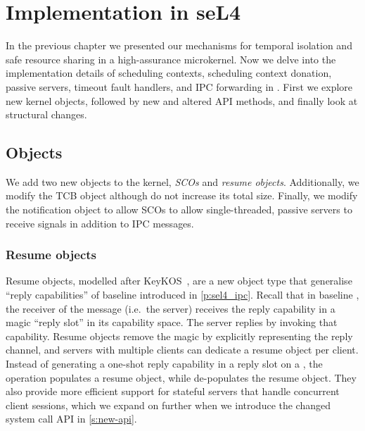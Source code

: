 \chapter{Implementation in seL4}
\label{chap:implementation}

In the previous chapter we presented our mechanisms for temporal isolation and safe resource sharing
in a high-assurance microkernel. 
Now we delve into the implementation details of scheduling contexts, scheduling context donation,
passive servers, timeout fault handlers, and IPC forwarding in \selfour. First we explore new kernel
objects, followed by new and altered API methods, and finally look at structural changes.

\section{Objects}

We add two new objects to the kernel, \emph{\glspl{SCO}} and \emph{resume objects}. Additionally, we modify
the \gls{TCB} object although do not increase its total size. Finally, we modify the notification
object to allow \glspl{SCO} to allow single-threaded, passive servers to receive signals in
addition to IPC messages.

\subsection{Resume objects}
\label{s:resume}

Resume objects, modelled after KeyKOS~\citep{Bomberger_FFHLS_92}, are a new object type that
generalise ``reply capabilities'' of baseline \selfour introduced in \cref{p:sel4_ipc}.  Recall that in
baseline \selfour, the receiver of the message (i.e.\ the server) receives the reply capability in a
magic ``reply slot'' in its capability space. The server replies by invoking that capability. Resume
objects remove the magic by explicitly representing the reply channel, and servers with multiple
clients can dedicate a resume object per client.  Instead of generating a one-shot reply capability
in a reply slot on a \call, the operation populates a resume object, while \recv de-populates the
resume object.  They also provide more efficient support for stateful servers that handle concurrent
client sessions, which we expand on further when we introduce the changed system call \gls{API} in
\cref{s:new-api}.

